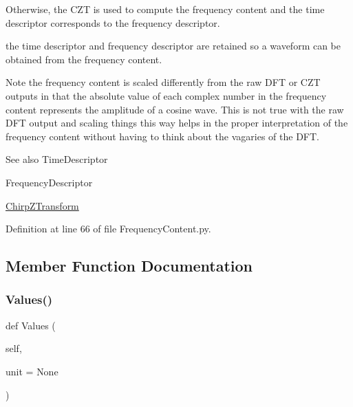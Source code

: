 Otherwise, the C\+ZT is used to compute the frequency content and the time descriptor corresponds to the frequency descriptor.

the time descriptor and frequency descriptor are retained so a waveform can be obtained from the frequency content.

\begin{DoxyNote}{Note}
the frequency content is scaled differently from the raw D\+FT or C\+ZT outputs in that the absolute value of each complex number in the frequency content represents the amplitude of a cosine wave. This is not true with the raw D\+FT output and scaling things this way helps in the proper interpretation of the frequency content without having to think about the vagaries of the D\+FT.
\end{DoxyNote}
\begin{DoxySeeAlso}{See also}
Time\+Descriptor 

Frequency\+Descriptor 

\hyperlink{namespaceSignalIntegrity_1_1ChirpZTransform}{Chirp\+Z\+Transform} 
\end{DoxySeeAlso}


Definition at line 66 of file Frequency\+Content.\+py.



\subsection{Member Function Documentation}
\mbox{\label{classSignalIntegrity_1_1FrequencyDomain_1_1FrequencyContent_1_1FrequencyContent_a3dc7b1e5eba8fb649156094dfdf7a893}} 
\subsubsection{\texorpdfstring{Values()}{Values()}}
{\footnotesize\ttfamily def Values (\begin{DoxyParamCaption}\item[{}]{self,  }\item[{}]{unit = {\ttfamily None} }\end{DoxyParamCaption})}




